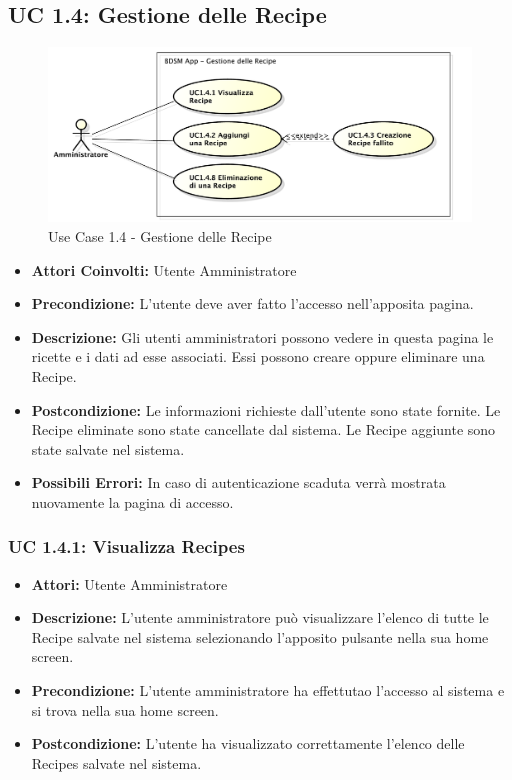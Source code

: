 \subsection{UC 1.4: Gestione delle Recipe}

\begin{figure}[htbp]
    \centering
    \centerline{\includegraphics[scale=0.5]{./images/UC1_4.pdf}}
    \caption{Use Case 1.4 - Gestione delle Recipe}
\end{figure}

\begin{itemize}
    \item \textbf{Attori Coinvolti:} Utente Amministratore

    \item \textbf{Precondizione:} L'utente deve aver fatto l'accesso nell'apposita pagina.

    \item \textbf{Descrizione:} Gli utenti amministratori possono vedere in questa pagina le ricette e i dati ad esse associati. Essi possono creare oppure eliminare una Recipe.

    \item \textbf{Postcondizione:} Le informazioni richieste dall'utente sono state fornite.
    Le Recipe eliminate sono state cancellate dal sistema.
    Le Recipe aggiunte sono state salvate nel sistema.

    \item \textbf{Possibili Errori:} In caso di autenticazione scaduta verrà mostrata nuovamente la pagina di accesso.
\end{itemize}

\subsubsection{UC 1.4.1: Visualizza Recipes}

\begin{itemize}
    \item \textbf{Attori:} Utente Amministratore
    \item \textbf{Descrizione:} L'utente amministratore può visualizzare l'elenco di tutte le Recipe salvate nel sistema selezionando l'apposito pulsante nella sua home screen.
    \item \textbf{Precondizione:} L'utente amministratore ha effettutao l'accesso al sistema e si trova nella sua home screen.
    \item \textbf{Postcondizione:} L'utente ha visualizzato correttamente l'elenco delle Recipes salvate nel sistema.
\end{itemize}

